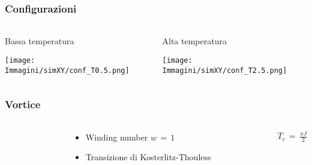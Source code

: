 \begin{frame}
    \frametitle{Configurazioni}
    \framesubtitle{}

    \begin{columns}
        \begin{column}{0.5\textwidth}
            \begin{block}{Bassa temperatura}

            \centering
            \texttt{[image: Immagini/simXY/conf\_T0.5.png]}

            \end{block}
        \end{column}
    
        \begin{column}{0.5\textwidth}
            \begin{block}{Alta temperatura}

                \centering
                \texttt{[image: Immagini/simXY/conf\_T2.5.png]}

            \end{block}
        \end{column}
    \end{columns}

\end{frame}



\begin{frame}
    \frametitle{Vortice}
    \framesubtitle{}

    \begin{columns}
        \begin{column}{0.5\textwidth}
            \centering
        \end{column}
    
        \begin{column}{0.5\textwidth}
            \begin{itemize}[itemsep=0.5em, label=$\diamond$]
                \item Winding number $w\,=\,1$
                \item Transizione di Kosterlitz-Thouless
            \end{itemize}
        \end{column}
        \vspace{12pt}
        $T_c\,=\,\frac{\pi J}{2} $
    \end{columns}

\end{frame}



